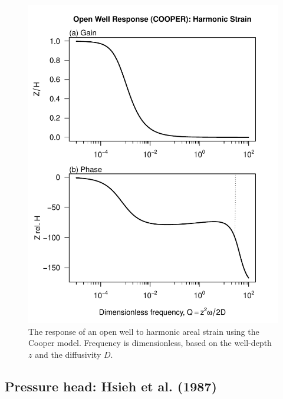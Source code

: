 \documentclass[12pt]{article}\usepackage[]{graphicx}\usepackage[]{color}
\makeatletter
\def\maxwidth{ %
  \ifdim\Gin@nat@width>\linewidth
    \linewidth
  \else
    \Gin@nat@width
  \fi
}
\newenvironment{knitrout}{}{} %
\makeatother
\begin{document}
\begin{figure}[htb!]
\begin{center}
\begin{knitrout}\small
{}\color{fgcolor}
\includegraphics[width=\maxwidth]{figure/COOPERRESPFIG-1} 

\end{knitrout}
\caption{The response of an open well to harmonic areal strain using
the Cooper model. 
Frequency is dimensionless, based on the well-depth $z$ and the diffusivity $D$.
}
\label{fig:owrsp-coop}
\end{center}
\end{figure}

\clearpage
\subsection{Pressure head: Hsieh et al. (1987)}
\end{document}
